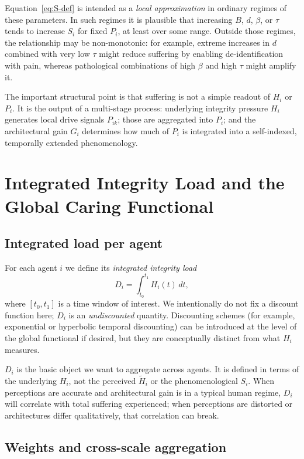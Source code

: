 \documentclass[11pt]{article}
\begin{document}
Equation~\eqref{eq:S-def} is intended as a \emph{local approximation} in ordinary regimes of these parameters. In such regimes it is plausible that increasing $B$, $d$, $\beta$, or $\tau$ tends to increase $S_i$ for fixed $P_i$, at least over some range. Outside those regimes, the relationship may be non-monotonic: for example, extreme increases in $d$ combined with very low $\tau$ might reduce suffering by enabling de-identification with pain, whereas pathological combinations of high $\beta$ and high $\tau$ might amplify it.

The important structural point is that suffering is not a simple readout of $H_i$ or $P_i$. It is the output of a multi-stage process: underlying integrity pressure $H_i$ generates local drive signals $P_{ik}$; those are aggregated into $P_i$; and the architectural gain $G_i$ determines how much of $P_i$ is integrated into a self-indexed, temporally extended phenomenology.

\section{Integrated Integrity Load and the Global Caring Functional}

\subsection{Integrated load per agent}

For each agent $i$ we define its \emph{integrated integrity load}
\begin{equation}
  D_i = \int_{t_0}^{t_1} H_i(t)\,dt,
\end{equation}
where $[t_0,t_1]$ is a time window of interest. We intentionally do not fix a discount function here; $D_i$ is an \emph{undiscounted} quantity. Discounting schemes (for example, exponential or hyperbolic temporal discounting) can be introduced at the level of the global functional if desired, but they are conceptually distinct from what $H_i$ measures.

$D_i$ is the basic object we want to aggregate across agents. It is defined in terms of the underlying $H_i$, not the perceived $\tilde H_i$ or the phenomenological $S_i$. When perceptions are accurate and architectural gain is in a typical human regime, $D_i$ will correlate with total suffering experienced; when perceptions are distorted or architectures differ qualitatively, that correlation can break.

\subsection{Weights and cross-scale aggregation}
\end{document}

